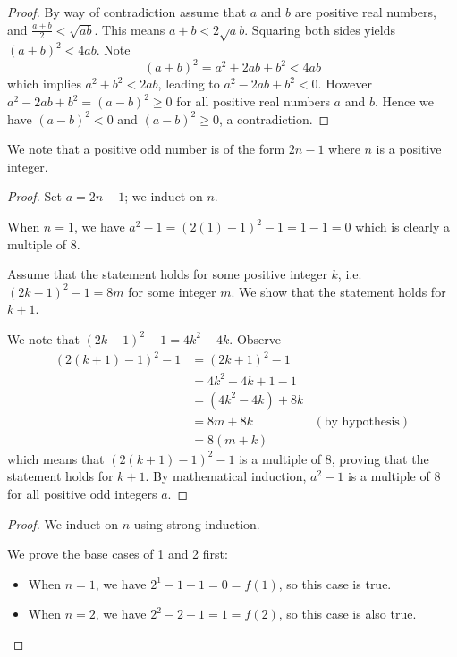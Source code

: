 \begin{questions}
    \item \begin{proof}
        By way of contradiction assume that $a$ and $b$ are positive real numbers, and $\frac{a+b}{2} < \sqrt{ab}$. This means $a+b<2\sqrt ab$. Squaring both sides yields $(a+b)^2 < 4ab$. Note
        \[
            (a+b)^2 = a^2 + 2ab + b^2 < 4ab    
        \]
        which implies $a^2 + b^2 < 2ab$, leading to $a^2 - 2ab + b^2 < 0$. However $a^2 - 2ab + b^2 = (a-b)^2 \geq 0$ for all positive real numbers $a$ and $b$. Hence we have $(a-b)^2 < 0$ and $(a-b)^2 \geq 0$, a contradiction.
    \end{proof}
    
    \item We note that a positive odd number is of the form $2n - 1$ where $n$ is a positive integer.
    
    \begin{proof}
        Set $a = 2n - 1$; we induct on $n$.
    
        When $n = 1$, we have $a^2 - 1 = (2(1) - 1)^2 - 1 = 1 - 1 = 0$ which is clearly a multiple of 8.
        
        Assume that the statement holds for some positive integer $k$, i.e. $(2k-1)^2 - 1 = 8m$ for some integer $m$. We show that the statement holds for $k + 1$.
        
        We note that $(2k-1)^2 - 1 = 4k^2 - 4k$. Observe
        \begin{align*}
            (2(k+1)-1)^2 - 1 &= (2k+1)^2 - 1\\
            &= 4k^2 + 4k + 1 - 1\\
            &= (4k^2 - 4k) + 8k\\
            &= 8m + 8k & (\text{by hypothesis})\\
            &= 8(m+k)
        \end{align*}
        which means that $(2(k+1)-1)^2 - 1$ is a multiple of 8, proving that the statement holds for $k+1$. By mathematical induction, $a^2 - 1$ is a multiple of 8 for all positive odd integers $a$.
    \end{proof}
    
    \item \begin{proof}
        We induct on $n$ using strong induction.
    
        We prove the base cases of 1 and 2 first:
        \begin{itemize}
            \item When $n = 1$, we have $2^1 - 1 - 1 = 0 = f(1)$, so this case is true.
            \item When $n = 2$, we have $2^2 - 2 - 1 = 1 = f(2)$, so this case is also true.
        \end{itemize}
        

\end{proof}
\end{questions}
